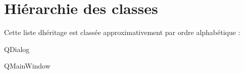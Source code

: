 \section{Hiérarchie des classes}
Cette liste d\textquotesingle{}héritage est classée approximativement par ordre alphabétique \+:\begin{DoxyCompactList}
\item {}
\item {}
\item {}
\item Q\+Dialog\begin{DoxyCompactList}
\item {}
\end{DoxyCompactList}
\item Q\+Main\+Window\begin{DoxyCompactList}
\item {}
\end{DoxyCompactList}
\item {}
\end{DoxyCompactList}
